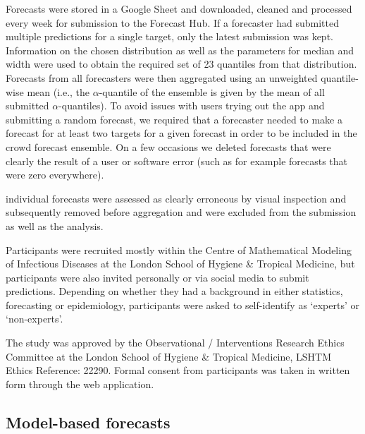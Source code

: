 \documentclass[10pt,letterpaper]{article}
\begin{document}
Forecasts were stored in a Google Sheet and downloaded, cleaned and
processed every week for submission to the Forecast Hub. If a forecaster
had submitted multiple predictions for a single target, only the latest
submission was kept. Information on the chosen distribution as well as
the parameters for median and width were used to obtain the required set
of 23 quantiles from that distribution. Forecasts from all forecasters
were then aggregated using an unweighted quantile-wise mean (i.e., the
\(\alpha\)-quantile of the ensemble is given by the mean of all
submitted \(\alpha\)-quantiles). To avoid issues with users trying out
the app and submitting a random forecast, we required that a forecaster
needed to make a forecast for at least two targets for a given forecast
in order to be included in the crowd forecast ensemble. On a few
occasions we deleted forecasts that were clearly the result of a user or
software error (such as for example forecasts that were zero
everywhere).

individual forecasts were assessed as clearly erroneous by visual
inspection and subsequently removed before aggregation and were excluded
from the submission as well as the analysis.

Participants were recruited mostly within the Centre of Mathematical
Modeling of Infectious Diseases at the London School of Hygiene \&
Tropical Medicine, but participants were also invited personally or via
social media to submit predictions. Depending on whether they had a
background in either statistics, forecasting or epidemiology,
participants were asked to self-identify as `experts' or `non-experts'.

The study was approved by the Observational / Interventions Research
Ethics Committee at the London School of Hygiene \& Tropical Medicine,
LSHTM Ethics Reference: 22290. Formal consent from participants was
taken in written form through the web application.

\hypertarget{model-based-forecasts}{%
\subsection{Model-based forecasts}\label{model-based-forecasts}}
\end{document}

